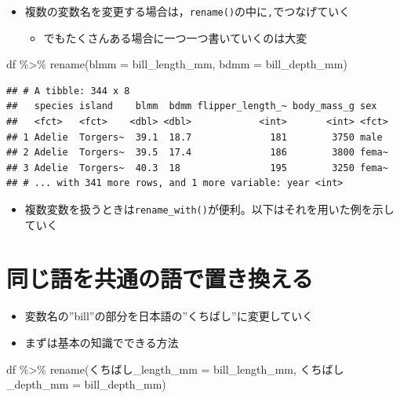 \documentclass[
  xelatex,ja=standard, b5paper]{bxjsbook}
\newenvironment{Shaded}{\begin{snugshade}}{\end{snugshade}}
\newcommand{\AttributeTok}[1]{\textcolor[rgb]{0.77,0.63,0.00}{#1}}
\newcommand{\FunctionTok}[1]{\textcolor[rgb]{0.00,0.00,0.00}{#1}}
\newcommand{\NormalTok}[1]{#1}
\newcommand{\SpecialCharTok}[1]{\textcolor[rgb]{0.00,0.00,0.00}{#1}}
\providecommand{\tightlist}{%
  \setlength{\itemsep}{0pt}\setlength{\parskip}{0pt}}
\begin{document}
\begin{itemize}
\tightlist
\item
  複数の変数名を変更する場合は，\texttt{rename()}の中に\texttt{,}でつなげていく

  \begin{itemize}
  \tightlist
  \item
    でもたくさんある場合に一つ一つ書いていくのは大変
  \end{itemize}
\end{itemize}

\begin{Shaded}
\begin{Highlighting}[]
\NormalTok{df }\SpecialCharTok{\%\textgreater{}\%} 
  \FunctionTok{rename}\NormalTok{(}\AttributeTok{blmm =}\NormalTok{ bill\_length\_mm,}
         \AttributeTok{bdmm =}\NormalTok{ bill\_depth\_mm)}
\end{Highlighting}
\end{Shaded}

\begin{verbatim}
## # A tibble: 344 x 8
##   species island    blmm  bdmm flipper_length_~ body_mass_g sex  
##   <fct>   <fct>    <dbl> <dbl>            <int>       <int> <fct>
## 1 Adelie  Torgers~  39.1  18.7              181        3750 male 
## 2 Adelie  Torgers~  39.5  17.4              186        3800 fema~
## 3 Adelie  Torgers~  40.3  18                195        3250 fema~
## # ... with 341 more rows, and 1 more variable: year <int>
\end{verbatim}

\begin{itemize}
\tightlist
\item
  複数変数を扱うときは\texttt{rename\_with()}が便利。以下はそれを用いた例を示していく
\end{itemize}

\hypertarget{rename-samew}{%
\section{同じ語を共通の語で置き換える}\label{rename-samew}}

\begin{itemize}
\tightlist
\item
  変数名の''bill''の部分を日本語の''くちばし''に変更していく
\item
  まずは基本の知識でできる方法
\end{itemize}

\begin{Shaded}
\begin{Highlighting}[]
\NormalTok{df }\SpecialCharTok{\%\textgreater{}\%} 
  \FunctionTok{rename}\NormalTok{(くちばし}\AttributeTok{\_length\_mm =}\NormalTok{ bill\_length\_mm,}
\NormalTok{         くちばし}\AttributeTok{\_depth\_mm =}\NormalTok{ bill\_depth\_mm)}
\end{Highlighting}
\end{Shaded}
\end{document}
